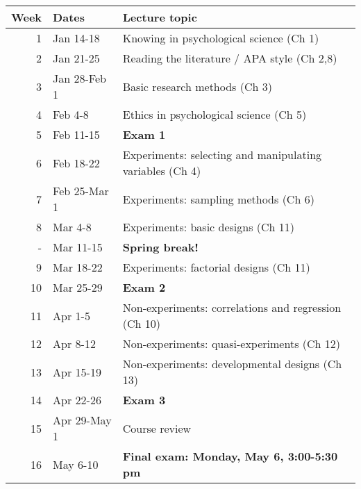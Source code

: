 \documentclass[10pt]{article}
\begin{document}
\begin{center}
\begin{tabular}{rll}
Week & Dates & Lecture topic\\
\hline
1 & Jan 14-18 & Knowing in psychological science (Ch 1)\\
2 & Jan 21-25 & Reading the literature / APA style (Ch 2,8)\\
3 & Jan 28-Feb 1 & Basic research methods (Ch 3)\\
4 & Feb 4-8 & Ethics in psychological science (Ch 5)\\
5 & Feb 11-15 & \textbf{Exam 1}\\
6 & Feb 18-22 & Experiments: selecting and manipulating variables (Ch 4)\\
7 & Feb 25-Mar 1 & Experiments: sampling methods (Ch 6)\\
8 & Mar 4-8 & Experiments: basic designs (Ch 11)\\
- & Mar 11-15 & \textbf{Spring break!}\\
9 & Mar 18-22 & Experiments: factorial designs (Ch 11)\\
10 & Mar 25-29 & \textbf{Exam 2}\\
11 & Apr 1-5 & Non-experiments: correlations and regression (Ch 10)\\
12 & Apr 8-12 & Non-experiments: quasi-experiments (Ch 12)\\
13 & Apr 15-19 & Non-experiments: developmental designs (Ch 13)\\
14 & Apr 22-26 & \textbf{Exam 3}\\
15 & Apr 29-May 1 & Course review\\
16 & May 6-10 & \textbf{Final exam: Monday, May 6, 3:00-5:30 pm}\\
\end{tabular}
\end{center}
\end{document}
